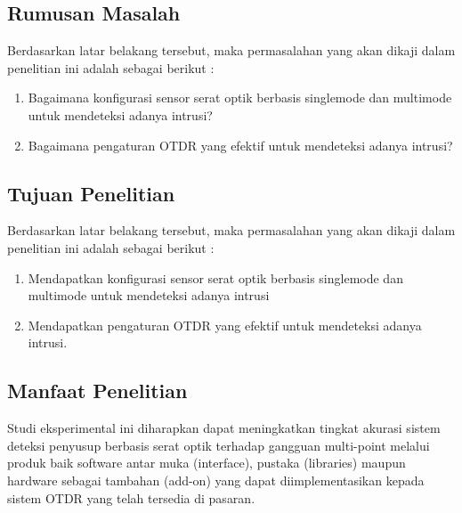 \documentclass[12pt]{article}
\begin{document}
	\newpage
	\subsection{Rumusan Masalah}
	
	Berdasarkan latar belakang tersebut, maka permasalahan yang akan dikaji dalam penelitian ini adalah sebagai berikut :
	
	\begin{enumerate}
		\item Bagaimana konfigurasi sensor serat optik berbasis singlemode dan multimode untuk mendeteksi adanya intrusi?
		\item Bagaimana pengaturan OTDR yang efektif untuk mendeteksi adanya intrusi?
	\end{enumerate}



	\subsection{Tujuan Penelitian}

	Berdasarkan latar belakang tersebut, maka permasalahan yang akan dikaji dalam penelitian ini adalah sebagai berikut :
	
	\begin{enumerate}
		\item Mendapatkan konfigurasi sensor serat optik berbasis  singlemode dan multimode untuk mendeteksi adanya intrusi
		\item Mendapatkan pengaturan OTDR yang efektif untuk mendeteksi adanya intrusi. 
	\end{enumerate}


	\subsection{Manfaat Penelitian}
	
	Studi eksperimental ini diharapkan dapat meningkatkan tingkat akurasi sistem deteksi penyusup berbasis serat optik terhadap gangguan multi-point melalui produk baik software antar muka (interface), pustaka (libraries) maupun hardware sebagai tambahan (add-on) yang dapat diimplementasikan kepada sistem OTDR yang telah tersedia di pasaran.
	


\end{document}
